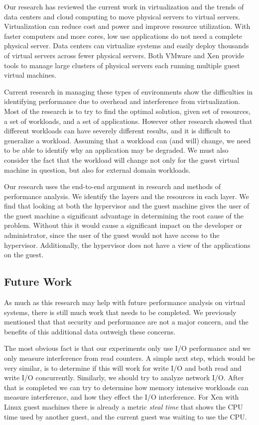 Our research has reviewed the current work in virtualization and the trends of data centers and cloud computing to move physical servers to virtual servers.  Virtualization can reduce cost and power and improve resource utilization.  With faster computers and more cores, low use applications do not need a complete physical server.  Data centers can virtualize systems and easily deploy thousands of virtual servers across fewer physical servers.  Both VMware and Xen provide tools to manage large clusters of physical servers each running multiple guest virtual machines.

Current research in managing these types of environments show the difficulties in identifying performance due to overhead and interference from virtualization.  Most of the research is to try to find the optimal solution, given set of resources, a set of workloads, and a set of applications.  However other research showed that different workloads can have severely different results, and it is difficult to generalize a workload.  Assuming that a workload can (and will) change, we need to be able to identify why an application may be degraded.  We must also consider the fact that the workload will change not only for the guest virtual machine in question, but also for external domain workloads. 

Our research uses the end-to-end argument in research and methods of performance analysis.  We identify the layers and the resources in each layer.  We find that looking at both the hypervisor and the guest machine gives the user of the guest machine a significant advantage in determining the root cause of the problem.  Without this it would cause a significant impact on the developer or administrator, since the user of the guest would not have access to the hypervisor.  Additionally, the hypervisor does not have a view of the applications on the guest.  


\subsection{Future Work}
As much as this research may help with future performance analysis on virtual systems, there is still much work that needs to be completed.  We previously mentioned that that security and performance are not a major concern, and the benefits of this additional data outweigh these concerns.

The most obvious fact is that our experiments only use I/O performance and we only measure interference from read counters.  A simple next step, which would be very similar, is to determine if this will work for write I/O and both read and write I/O concurrently. Similarly, we should try to analyze network I/O. After that is completed we can try to determine how memory intensive workloads can measure interference, and how they effect the I/O interference.  For Xen with Linux guest machines there is already a metric \emph{steal time} that shows the CPU time used by another guest, and the current guest was waiting to use the CPU.

